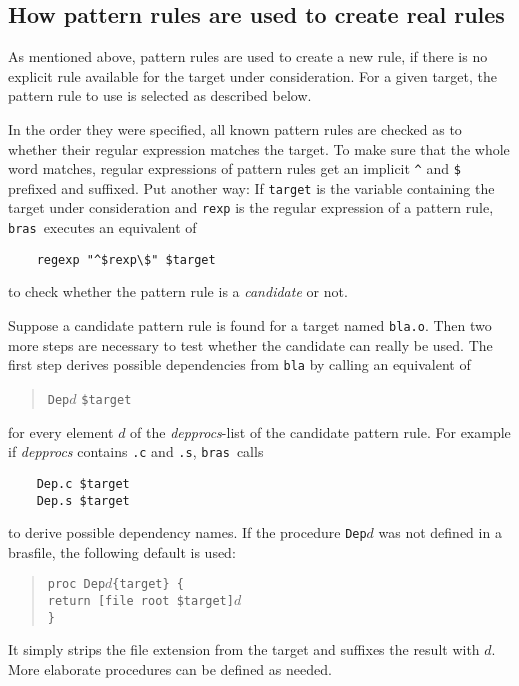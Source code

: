 \documentclass[12pt]{article}
\newcommand{\bras}{\texttt{bras}}
\begin{document}
\subsection{How pattern rules are used to create real rules}
\label{secSuffixToReal}

As mentioned above, pattern rules are used to create a new rule, if
there is no explicit rule available for the target under
consideration. 
For a given target, the pattern rule to use is selected as described
below.

In the order they were specified, all known pattern rules are checked
as to whether their regular expression matches the target. To make
sure that the whole word matches, regular expressions of pattern rules
get an implicit \verb+^+ and \texttt{\$} prefixed and suffixed. Put
another way: If \texttt{target} is the variable containing the target
under consideration and \texttt{rexp} is the regular expression of a
pattern rule, \bras\ executes an equivalent of
\begin{verbatim}
    regexp "^$rexp\$" $target
\end{verbatim}
to check whether the pattern rule is a \textit{candidate} or not.

Suppose a candidate pattern rule is found for a target named
\texttt{bla.o}. Then two more steps are necessary
to test whether the candidate can really be used.
The first step derives possible dependencies
from \texttt{bla} by calling
an equivalent of
\begin{quote}
    \texttt{Dep}$d$ \texttt{\$target}
\end{quote}
for every element $d$ of the \textit{depprocs}-list of the candidate
pattern rule. For example if \textit{depprocs} contains \texttt{.c}
and \texttt{.s}, \bras\ calls
\begin{verbatim}
    Dep.c $target
    Dep.s $target
\end{verbatim}
to derive possible dependency names. If the procedure \texttt{Dep$d$}
was not defined in a brasfile, the following
default is used:
\begin{quote}
    \verb|proc Dep|$d$\verb|{target} {|\\
    \texttt{\hspace*{2em}return [file root \$target]$d$}\\
    \verb|}|
\end{quote}
It simply strips the file extension from the target and suffixes the
result with $d$. More elaborate
procedures can be defined as needed.
\end{document}
